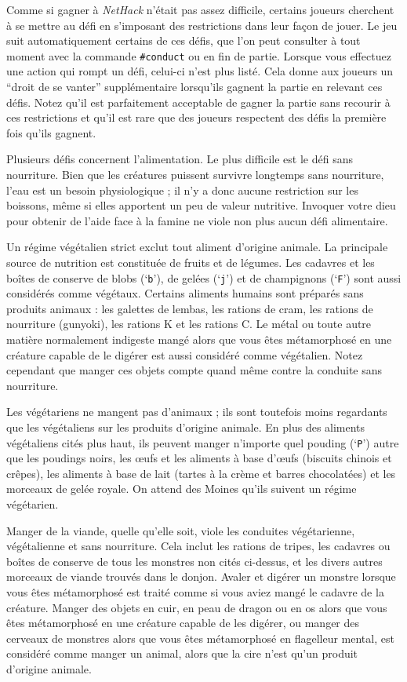 \documentclass[titlepage]{article}
\begin{document}
Comme si gagner à \textit{NetHack} n'était pas assez difficile, certains joueurs
cherchent à se mettre au défi en s'imposant des restrictions dans
leur façon de jouer.  Le jeu suit automatiquement certains de
ces défis, que l'on peut consulter à tout moment avec la commande \texttt{\#conduct}
ou en fin de partie.  Lorsque vous effectuez une action qui
rompt un défi, celui-ci n'est plus listé.  Cela donne aux
joueurs un ``droit de se vanter'' supplémentaire lorsqu'ils gagnent la partie en relevant ces
défis.  Notez qu'il est parfaitement acceptable de gagner la partie
sans recourir à ces restrictions et qu'il est rare que des
joueurs respectent des défis la première fois qu'ils gagnent.

Plusieurs défis concernent l'alimentation.  Le plus
difficile est le défi sans nourriture.  Bien que les créatures
puissent survivre longtemps sans nourriture, l'eau est un besoin
physiologique ; il n'y a donc aucune restriction sur les boissons,
même si elles apportent un peu de valeur nutritive.
Invoquer votre dieu pour obtenir de l'aide face à la famine ne
viole non plus aucun défi alimentaire.

Un régime végétalien strict exclut tout aliment d'origine animale.
La principale source de nutrition est constituée de fruits et de légumes.  Les
cadavres et les boîtes de conserve de blobs (`\texttt{b}'), de gelées (`\texttt{j}') et de champignons
(`\texttt{F}') sont aussi considérés comme végétaux.  Certains aliments
humains sont préparés sans produits animaux : les galettes de lembas, les rations
de cram, les rations de nourriture (gunyoki), les rations K et les rations C.
Le métal ou toute autre matière normalement indigeste mangé alors que vous êtes
métamorphosé en une créature capable de le digérer est aussi considéré comme végétalien.
Notez cependant que manger ces objets compte quand même contre la conduite sans nourriture.

Les végétariens ne mangent pas d'animaux ;
ils sont toutefois moins regardants que les végétaliens sur les produits d'origine animale.
En plus des aliments végétaliens cités plus haut, ils peuvent manger n'importe quel
pouding (`\texttt{P}') autre que les poudings noirs,
les œufs et les aliments à base d'œufs (biscuits chinois et crêpes),
les aliments à base de lait (tartes à la crème et barres chocolatées) et les morceaux
de gelée royale.  On attend des Moines qu'ils suivent un régime végétarien.

Manger de la viande, quelle qu'elle soit, viole les conduites végétarienne,
végétalienne et sans nourriture.  Cela inclut les rations de tripes, les cadavres ou
boîtes de conserve de tous les monstres non cités ci-dessus, et les divers autres
morceaux de viande trouvés dans le donjon.  Avaler et digérer un monstre lorsque
vous êtes métamorphosé est traité comme si vous aviez mangé le cadavre de la créature.
Manger des objets en cuir, en peau de dragon ou en os alors que vous êtes
métamorphosé en une créature capable de les digérer, ou manger des cerveaux de monstres
alors que vous êtes métamorphosé en flagelleur mental, est considéré comme manger
un animal, alors que la cire n'est qu'un produit d'origine animale.
\end{document}
